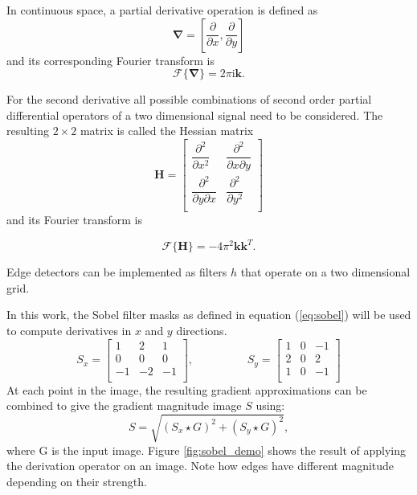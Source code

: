 		In continuous space, a partial derivative operation is defined as
		\begin{equation}
		 	\mathbf{\nabla} = \left[ \dfrac{\partial}{\partial x}, \dfrac{\partial}{\partial y} \right]
		\end{equation}
		and its corresponding Fourier transform is
		\begin{equation}
			\mathscr{F}\{\mathbf{\nabla}\} = 2 \pi \text{i} \mathbf{k}.
		\end{equation}
		
		For the second derivative all possible combinations of second order partial differential operators of a two dimensional signal need to be considered. The resulting $2 \times 2$ matrix is called the Hessian matrix
		\begin{equation}
			\mathbf{H} = 
				\begin{bmatrix}
   \dfrac{\partial^2}{\partial x^2}       & \dfrac{\partial^2}{\partial x \partial y}\\
   \dfrac{\partial^2}{\partial y \partial x}       & \dfrac{\partial^2}{\partial y^2}\\
				\end{bmatrix}
				\label{eq:hessian_def}
		\end{equation}
		and its Fourier transform is
		
		\begin{equation}
			\mathscr{F}\{\mathbf{H}\} = -4 \pi^2 \mathbf{k}\mathbf{k}^T.
		\end{equation}
		
		
		Edge detectors can be implemented as filters $h$ that operate on a two dimensional grid. 

			
		In this work, the Sobel filter masks as defined in equation (\ref{eq:sobel}) will be used to compute derivatives in $x$ and $y$ directions. 
		\begin{equation}
			S_x =
			 \begin{bmatrix}
     				1	& 2 & 1 \\
    					0	 & 0 & 0 \\
    					-1	 & -2 & -1 \\
				\end{bmatrix},
			\hspace{2cm}
			S_y = 
				\begin{bmatrix}
     				1	& 0 & -1 \\
    					2	 & 0 & 2 \\
    					1	 & 0 & -1 \\
				\end{bmatrix}
			\label{eq:sobel}
			\end{equation}
		At each point in the image, the resulting gradient approximations can be combined to give the gradient magnitude image $S$ using:
		\begin{equation}
			S = \sqrt{(S_x \star G )^2 + (S_y \star G)^2},
			\label{eq:grad_sobel}
		\end{equation}
		where G is the input image. Figure \ref{fig:sobel_demo} shows the result of applying the derivation operator on an image. Note how edges have different magnitude depending on their strength. 
		

